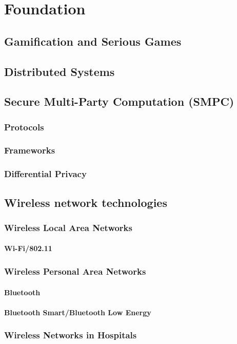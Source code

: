 \chapter{Foundation}
	\section{Gamification and Serious Games}
	\section{Distributed Systems}
	\section{Secure Multi-Party Computation (SMPC)}
	\subsection*{Protocols}
	\subsection*{Frameworks}
	\subsection*{Differential Privacy}
	\section{Wireless network technologies}
	\subsection*{Wireless Local Area Networks}
	\subsubsection*{Wi-Fi/802.11}
	\subsection*{Wireless Personal Area Networks}
	\subsubsection*{Bluetooth}
	\subsubsection*{Bluetooth Smart/Bluetooth Low Energy}
	\subsection*{Wireless Networks in Hospitals}
